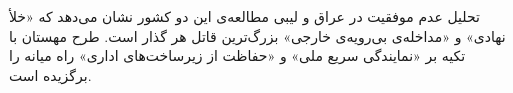 \begin{center}
\end{center}

\begin{modernbox}{تحلیل عدم موفقیت در عراق و لیبی}
مطالعه‌ی این دو کشور نشان می‌دهد که «خلأ نهادی» و «مداخله‌ی بی‌رویه‌ی خارجی» بزرگ‌ترین قاتل هر گذار است. طرح مهستان با تکیه بر «نمایندگی سریع ملی» و «حفاظت از زیرساخت‌های اداری» راه میانه را برگزیده است.
\end{modernbox}
